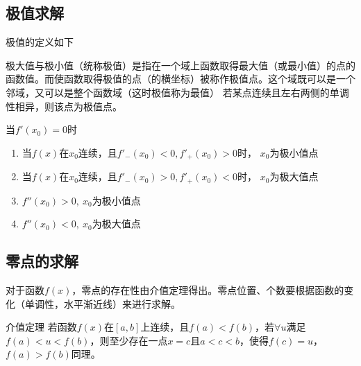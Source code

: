 \subsection{极值求解}
极值的定义如下
\begin{definition}
    极大值与极小值（统称极值）是指在一个域上函数取得最大值（或最小值）的点的函数值。而使函数取得极值的点（的横坐标）被称作极值点。这个域既可以是一个邻域，又可以是整个函数域（这时极值称为最值）
    若某点连续且左右两侧的单调性相异，则该点为极值点。
\end{definition}
\begin{theorem}
    当$f'(x_0)=0$时
    \begin{enumerate}
        \item 当$f(x)$在$x_0$连续，且$f'_-(x_0)<0,f'_+(x_0)>0$时， $x_0$为极小值点
        \item 当$f(x)$在$x_0$连续，且$f'_-(x_0)>0,f'_+(x_0)<0$时， $x_0$为极大值点
        \item $f''(x_0)>0,\ x_0$为极小值点
        \item $f''(x_0)<0,\ x_0$为极大值点
    \end{enumerate}
\end{theorem}

\subsection{零点的求解}
对于函数$f(x)$，零点的存在性由介值定理得出。零点位置、个数要根据函数的变化（单调性，水平渐近线）来进行求解。
\begin{theorem}
    介值定理
    \label{th:介值定理}
    若函数$f(x)$在$[a,b]$上连续，且$f(a)<f(b)$，若$\forall u$满足$f(a)<u<f(b)$，则至少存在一点$x=c$且$a<c<b$，使得$f(c)=u$，$f(a)>f(b)$同理。
\end{theorem}


